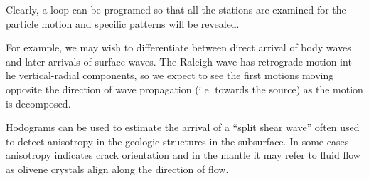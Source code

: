 \documentclass{article}
\begin{document}
Clearly,  a loop
can be programed so that all the stations are examined for the 
particle motion and specific patterns will be revealed.

For example, we may wish to differentiate 
between direct arrival of body waves
and later arrivals of surface waves.
The Raleigh wave has retrograde motion int he vertical-radial 
components, so we expect to see the first motions moving 
opposite the direction of wave propagation (i.e. towards the source)
as the motion is decomposed.


Hodograms  can be used to estimate 
the arrival of a ``split shear wave'' often used to 
detect anisotropy in the geologic structures in the subsurface.
In some cases anisotropy indicates crack orientation and in the mantle 
it may refer to fluid flow as olivene crystals align
along the direction of flow.
\end{document}
